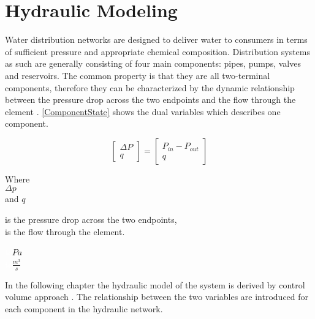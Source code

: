 \section{Hydraulic Modeling}
\label{HydraulicModel}


Water distribution networks are designed to deliver water to consumers in terms of sufficient pressure and appropriate chemical composition. Distribution systems as such are generally consisting of four main components: pipes, pumps, valves and reservoirs. The common property is that they are all two-terminal components, therefore they can be characterized by the dynamic relationship between the pressure drop across the two endpoints and the flow through the element \cite{Kallesoe2009}.  \eqref{ComponentState} shows the dual variables which describes one component. 

\begin{equation}
\label{ComponentState}
 \begin{bmatrix}
    \Delta P \\
    q
\end{bmatrix}
=
 \begin{bmatrix}
    P_{in} - P_{out} \\
    q
\end{bmatrix}
\end{equation}

 \begin{minipage}[t]{0.20\textwidth}
Where\\
\hspace*{8mm} $\Delta p$ \\
and \hspace*{0.7mm} $q$ 
\end{minipage}
\begin{minipage}[t]{0.68\textwidth}
\vspace*{2mm}
is the pressure drop across the two endpoints,\\
is the flow through the element.
\end{minipage}
\begin{minipage}[t]{0.10\textwidth}
\vspace*{2mm}
\textcolor{White}{te}$\unit{Pa}$\\
\textcolor{White}{te}$\unit{\frac{m^{3}}{s}}$
\end{minipage}

In the following chapter the hydraulic model of the system is derived by control volume approach \cite{Hunt_Fluidmechanics}. The relationship between the two variables are introduced for each component in the hydraulic network.

